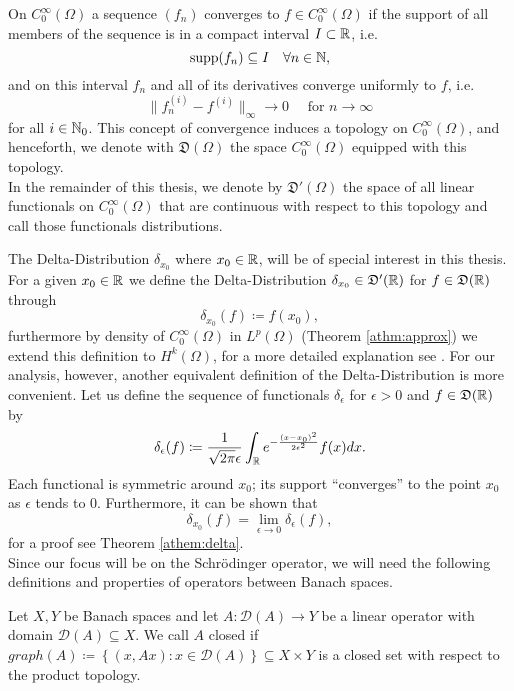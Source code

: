 \begin{definition}[Distributions]
	On $C_{0}^{\infty}(\Omega)$ a sequence $(f_{n})$ converges to $f \in C_{0}^{\infty}(\Omega)$ if the support of all members of the sequence is in a compact interval $I \subset \mathbb{R}$, i.e.
	$$ \operatorname{supp} (f_{n}) \subseteq I \quad \forall n \in \mathbb{N}, $$
	and on this interval $f_{n}$ and all of its derivatives converge uniformly to $f$, i.e.
	\[ \| f_{n}^{(i)} - f^{(i)} \|_{\infty} \rightarrow 0 \quad \text{ for } n \rightarrow \infty \]
	for all $i \in \mathbb{N}_{0}$. This concept of convergence induces a topology on $C_{0}^{\infty}(\Omega)$, and henceforth, we denote with $\mathfrak{D}(\Omega)$ the space $C_{0}^{\infty}(\Omega)$ equipped with this topology.
~\\

	In the remainder of this thesis, we denote by $\mathfrak{D}'(\Omega)$ the space of all linear functionals on $C_{0}^{\infty}(\Omega)$ that are continuous with respect to this topology and call those functionals distributions.  
\end{definition}

The Delta-Distribution $\delta_{x_{0}}$ where $x_{0} \in \mathbb{R}$, will be of special interest in this thesis. For a given $x_{0} \in \mathbb{R}$ we define the Delta-Distribution $\delta_{x_{0}} \in \mathfrak{D}'(\mathbb{R})$ for $f \in \mathfrak{D}(\mathbb{R})$ through
		\[  \delta_{x_{0}}(f) \coloneqq f(x_{0}), \]
	furthermore by density of $C_{0}^{\infty}(\Omega)$ in $L^{p}(\Omega)$ (Theorem \ref{athm:approx}) we extend this definition to $H^{k}(\Omega)$, for a more detailed explanation see \cite[p. 429]{werner2006funkana}. For our analysis, however, another equivalent definition of the Delta-Distribution is more convenient. Let us define the sequence of functionals $\delta_{\epsilon}$ for $\epsilon > 0$ and $f \in \mathfrak{D}(\mathbb{R})$ by
	\begin{equation}
		\delta_{\epsilon}(f) \coloneqq \frac{1}{\sqrt{2 \pi} \epsilon} \int_{\mathbb{R}} e^{-\frac{(x - x_{0})^{2}}{2 \epsilon^{2}}} f(x) dx. \label{eq:2.1-smooth_potential}
	\end{equation}
 	Each functional is symmetric around $x_{0}$; its support \enquote{converges} to the point $x_{0}$ as $\epsilon$ tends to $0$. Furthermore, it can be shown that
 	\[ \delta_{x_{0}}(f) = \lim_{\epsilon \rightarrow 0} \delta_{\epsilon}(f), \]
 	for a proof see Theorem \ref{athem:delta}.
~\\

Since our focus will be on the Schrödinger operator, we will need the following definitions and properties of operators between Banach spaces.
\begin{definition} 
Let $X, Y$ be Banach spaces and let $A \colon \mathcal{D}(A) \rightarrow Y$ be a linear operator with domain $\mathcal{D}(A) \subseteq X$. We call $A$ closed if $graph(A) \coloneqq \left\{ (x, Ax) : x \in \mathcal{D}(A) \right\} \subseteq X \times Y$ is a closed set with respect to the product topology.
\end{definition}

